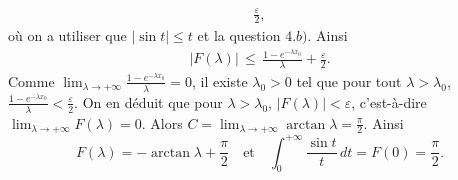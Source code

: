 {\begin{enumerate}
{\begin{eqnarray*}
\frac{\varepsilon}{2},
\end{eqnarray*}
o\`u on a utiliser que $|\sin t| \leq t$ et la question $4. b)$.
Ainsi
\begin{eqnarray*}
|F(\lambda)| \,\leq \, \frac{1 - e^{-\lambda x_{0}}}{\lambda} +
\frac{\varepsilon}{2}.
\end{eqnarray*}
Comme $\lim_{\lambda \rightarrow +\infty}\frac{1 - e^{-\lambda
x_{0}}}{\lambda} = 0$, il existe ${\lambda}_{0} > 0$ tel que pour
tout $\lambda > {\lambda}_{0}$, $\frac{1 - e^{-\lambda
x_{0}}}{\lambda} < \frac{\varepsilon}{2}$. On en d\'eduit que pour
$\lambda > {\lambda}_{0}$, $|F(\lambda)| < \varepsilon$,
c'est-\`a-dire $\lim_{\lambda \rightarrow +\infty}F(\lambda) = 0$.
Alors $C = \lim_{\lambda \rightarrow +\infty} \arctan \lambda =
\frac{\pi}{2}$. Ainsi
$$
F(\lambda) = -\arctan \lambda + \frac{\pi}{2} \quad \text{et}\quad
\int_{0}^{+\infty} \frac{\sin t}{t}\,dt = F(0) = \frac{\pi}{2}.
$$}
\end{enumerate}
}
